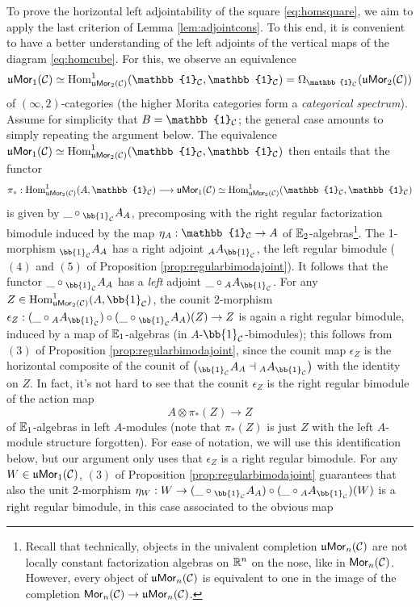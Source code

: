 \documentclass[10pt, reqno, twoside
, final
]{amsart}
\numberwithin{equation}{subsection}%
\theoremstyle{definition}
\theoremstyle{definition}
\theoremstyle{definition}
\theoremstyle{definition}
\theoremstyle{definition}
\theoremstyle{definition}
\theoremstyle{definition}
\theoremstyle{definition}
\theoremstyle{definition}
\theoremstyle{plain}
\theoremstyle{definition}
\theoremstyle{plain}
\theoremstyle{definition}
\theoremstyle{plain}
\theoremstyle{definition}
\theoremstyle{definition}
\theoremstyle{plain}
\theoremstyle{plain}
\theoremstyle{definition}
\theoremstyle{plain}
\theoremstyle{plain}
\theoremstyle{plain}
\begin{document}
To prove the horizontal left adjointability of the square \eqref{eq:homsquare}, we aim to apply the last criterion of Lemma \ref{lem:adjointcons}. To this end, it is convenient to have a better understanding of the left adjoints of the vertical maps of the diagram \eqref{eq:homcube}. For this, we observe an equivalence 
\[  \umor_1(\icat)\simeq \Hom^1_{\umor_2(\icat)}(\mathbb{1}_{\icat},\mathbb{1}_{\icat}) = \Omega_{\mathbb{1}_{\icat}}(\umor_2(\icat))  \]
of $(\infty,2)$-categories (the higher Morita categories form a \emph{categorical spectrum}). Assume for simplicity that $B=\mathbb{1}_{\icat}$; the general case amounts to simply repeating the argument below. The equivalence $\umor_1(\icat)\simeq \Hom^1_{\umor_2(\icat)}(\mathbb{1}_{\icat},\mathbb{1}_{\icat})$ then entails that the functor
\[ \pi_*: \Hom^1_{\umor_2(\icat)}(A,\mathbb{1}_{\icat}) \longrightarrow  \umor_1(\icat)  \simeq \Hom^1_{\umor_2(\icat)}(\mathbb{1}_{\icat},\mathbb{1}_{\icat}) \]
is given by $\_\circ {}_{\bb{1}_{\icat}}A_{A}$, precomposing with the right regular factorization bimodule induced by the map $\eta_A:\mathbb{1}_{\icat}\rightarrow A$ of $\mathbb{E}_2$-algebras\footnote{Recall that technically, objects in the univalent completion $\mathfrak{u}\mathsf{Mor}_n(\mathcal{C})$ are not locally constant factorization algebras on $\mathbb{R}^n$ on the nose, like in $\mathsf{Mor}_n(\mathcal{C})$. However, every object of $\mathfrak{u}\mathsf{Mor}_n(\mathcal{C})$ is equivalent to one in the image of the completion $\mathsf{Mor}_n(\mathcal{C})\rightarrow \mathfrak{u}\mathsf{Mor}_n(\mathcal{C})$.}. The 1-morphism ${}_{\bb{1}_{\icat}}A_{A}$ has a right adjoint ${}_AA_{\bb{1}_{\icat}}$, the left regular bimodule ($(4)$ and $(5)$ of Proposition \ref{prop:regularbimodajoint}). It follows that the functor $\_\circ {}_{\bb{1}_{\icat}}A_A$ has a \emph{left} adjoint $\_\circ {}_AA_{\bb{1}_{\icat}}$. For any $Z\in \Hom^1_{\umor_2(\icat)}(A,\bb{1}_{\icat})$, the counit 2-morphism $\epsilon_Z:(\_\circ {}_AA_{\bb{1}_{\icat}})\circ ( \_\circ {}_{\bb{1}_{\icat}}A_{A})(Z)\rightarrow Z$ is again a right regular bimodule, induced by a map of $\mathbb{E}_1$-algebras (in $A$-$\bb{1}_{\icat}$-bimodules); this follows from $(3)$ of Proposition \ref{prop:regularbimodajoint}, since the counit map $\epsilon_Z$ is the horizontal composite of the counit of $\left({}_{\bb{1}_{\icat}}A_A\adj {}_{A}A_{\bb{1}_{\icat}}  \right)$ with the identity on $Z$. In fact, it's not hard to see that the counit $\epsilon_Z$ is the right regular bimodule of the action map 
\[  A\otimes \pi_*(Z)\longrightarrow Z \]
of $\mathbb{E}_1$-algebras in left $A$-modules (note that $\pi_*(Z)$ is just $Z$ with the left $A$-module structure forgotten). For ease of notation, we will use this identification below, but our argument only uses that $\epsilon_Z$ is a right regular bimodule. For any $W\in \mathfrak{u}\mathsf{Mor}_1(\mathcal{C})$, $(3)$ of Proposition \ref{prop:regularbimodajoint} guarantees that also the unit 2-morphism $\eta_W:W\rightarrow ( \_\circ {}_{\bb{1}_{\icat}}A_{A})\circ (\_\circ {}_AA_{\bb{1}_{\icat}})(W)$ is a right regular bimodule, in this case associated to the obvious map 
\end{document}
